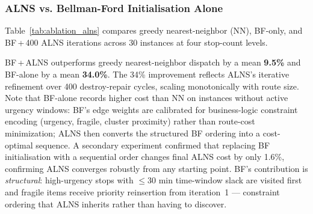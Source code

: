 \documentclass[conference]{IEEEtran}
\begin{document}
\subsubsection{ALNS vs. Bellman-Ford Initialisation Alone}

Table~\ref{tab:ablation_alns} compares greedy nearest-neighbor (NN), BF-only,
and BF\,+\,400 ALNS iterations across 30 instances at four stop-count levels.

\begin{table}[H]
\centering
\caption{NN-only vs.\ BF-only vs.\ BF\,+\,ALNS — Mean Route Cost (30 instances
per stop count, 400 ALNS iterations, \texttt{random\_state=42}).
NN-only column from \texttt{ablation\_alns.py}; BF-only and BF\,+\,ALNS columns
from \texttt{ablation\_bf\_vs\_alns.py}.}
\label{tab:ablation_alns}
\end{table}

BF\,+\,ALNS outperforms greedy nearest-neighbor dispatch by a mean \textbf{9.5\%}
and BF-alone by a mean \textbf{34.0\%}. The 34\% improvement reflects ALNS's
iterative refinement over 400 destroy-repair cycles, scaling monotonically with
route size. Note that BF-alone records higher cost than NN on instances without
active urgency windows: BF's edge weights are calibrated for business-logic
constraint encoding (urgency, fragile, cluster proximity) rather than
route-cost minimization; ALNS then converts the structured BF ordering into a
cost-optimal sequence. A secondary experiment confirmed that replacing BF initialisation with a
sequential order changes final ALNS cost by only 1.6\%, confirming ALNS
converges robustly from any starting point. BF's contribution is
\textit{structural}: high-urgency stops with $\leq$30 min time-window slack are
visited first and fragile items receive priority reinsertion from iteration~1 —
constraint ordering that ALNS inherits rather than having to discover.
\end{document}
